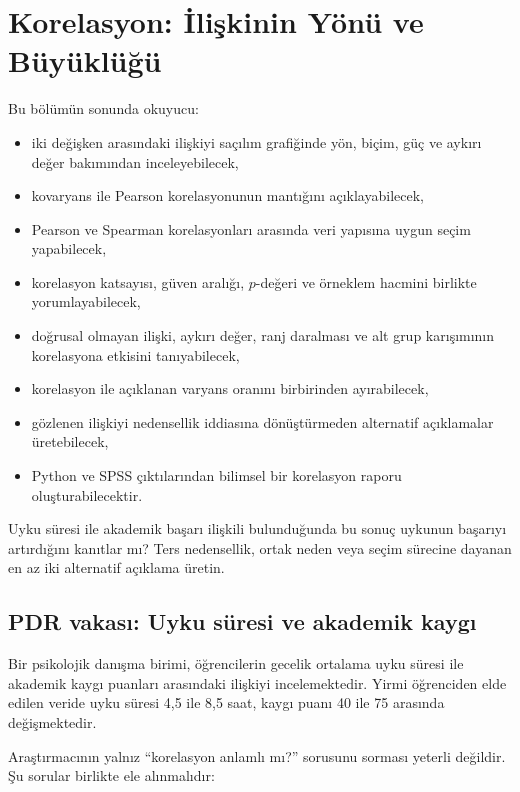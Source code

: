 \chapter{Korelasyon: İlişkinin Yönü ve Büyüklüğü}

\begin{hedefler}
Bu bölümün sonunda okuyucu:
\begin{itemize}
  \item iki değişken arasındaki ilişkiyi saçılım grafiğinde yön, biçim, güç ve aykırı değer bakımından inceleyebilecek,
  \item kovaryans ile Pearson korelasyonunun mantığını açıklayabilecek,
  \item Pearson ve Spearman korelasyonları arasında veri yapısına uygun seçim yapabilecek,
  \item korelasyon katsayısı, güven aralığı, $p$-değeri ve örneklem hacmini birlikte yorumlayabilecek,
  \item doğrusal olmayan ilişki, aykırı değer, ranj daralması ve alt grup karışımının korelasyona etkisini tanıyabilecek,
  \item korelasyon ile açıklanan varyans oranını birbirinden ayırabilecek,
  \item gözlenen ilişkiyi nedensellik iddiasına dönüştürmeden alternatif açıklamalar üretebilecek,
  \item Python ve SPSS çıktılarından bilimsel bir korelasyon raporu oluşturabilecektir.
\end{itemize}
\end{hedefler}

\begin{hazirlik}
Uyku süresi ile akademik başarı ilişkili bulunduğunda bu sonuç uykunun başarıyı
artırdığını kanıtlar mı? Ters nedensellik, ortak neden veya seçim sürecine
dayanan en az iki alternatif açıklama üretin.
\end{hazirlik}

\section{PDR vakası: Uyku süresi ve akademik kaygı}

Bir psikolojik danışma birimi, öğrencilerin gecelik ortalama uyku süresi ile
akademik kaygı puanları arasındaki ilişkiyi incelemektedir. Yirmi öğrenciden
elde edilen veride uyku süresi 4,5 ile 8,5 saat, kaygı puanı 40 ile 75 arasında
değişmektedir.

Araştırmacının yalnız ``korelasyon anlamlı mı?'' sorusunu sorması yeterli
değildir. Şu sorular birlikte ele alınmalıdır:

